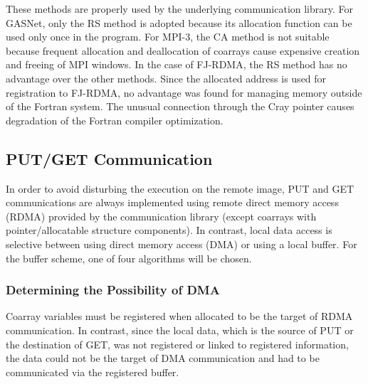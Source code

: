 These methods are properly used by the underlying communication library.
%
For GASNet, only the RS method is adopted because its allocation function
can be used only once in the program.
%
For MPI-3, the CA method is not suitable because frequent 
allocation and deallocation of coarrays cause expensive creation and freeing of 
MPI windows.
%
In the case of FJ-RDMA, the RS method has no advantage over the other methods.
Since the allocated address is used for registration to FJ-RDMA, 
no advantage was found for managing memory outside of the Fortran system. 
The unusual connection through the Cray pointer causes degradation of 
the Fortran compiler optimization.


\subsection{PUT/GET Communication}\label{sec:putget}

In order to avoid disturbing the execution on the remote image, PUT and GET communications
are always implemented using remote direct memory access (RDMA) provided by 
the communication library (except coarrays with pointer/allocatable structure components). 
In contrast, local data access is selective between using direct memory access (DMA) or
using a local buffer. For the buffer scheme, one of four algorithms will be chosen.


\subsubsection{Determining the Possibility of DMA}\label{sec:opt-dma}

Coarray variables must be registered when allocated to be 
the target of RDMA communication. In contrast, since the local
data, which is the source of PUT or the destination of GET,
was not registered or linked to registered information,
the data could not be the target of DMA communication and had to be communicated via the registered buffer.

